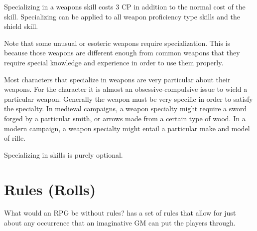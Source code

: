 \documentclass[twoside]{book}
\begin{document}
    {  
    Specializing in a weapons skill costs 3 CP in
                 addition to the normal cost of the skill. Specializing
                 can be applied to all weapon proficiency type skills and
                 the shield skill. 
    }
  
  

  

  
    {  
    Note that some unusual or esoteric weapons require
                 specialization. This is because those weapons are
                 different enough from common weapons that they require
                 special knowledge and experience in order to use them
                 properly. 
    }
  
    {  
    Most characters that specialize in weapons are
                 very particular about their weapons. For the character
                 it is almost an obsessive-compulsive issue to wield a
                 particular weapon. Generally the weapon must be very
                 specific in order to satisfy the specialty. In medieval
                 campaigns, a weapon specialty might require a sword
                 forged by a particular smith, or arrows made from a
                 certain type of wood. In a modern campaign, a weapon
                 specialty might entail a particular make and model of
                 rifle. 
    }
  
    {  
    Specializing in skills is purely optional. 
    }
  
    

\section{Rules (Rolls)}
    
    {  
    What would an RPG be without rules? \APATHY{}  has a
            set of rules that allow for just about any occurrence that an
            imaginative GM can put the players through.
          
    }
  
\end{document}
